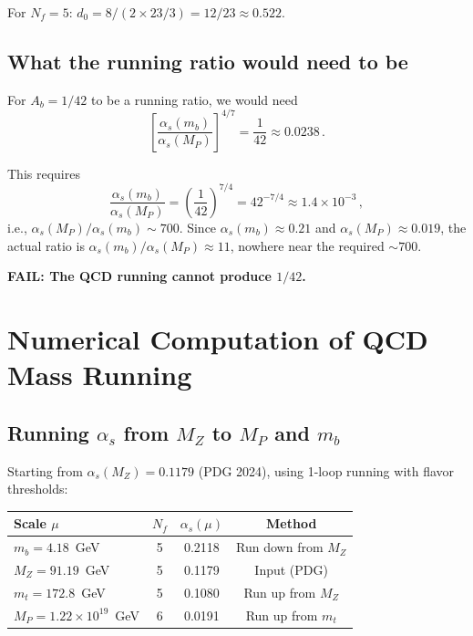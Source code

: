 \documentclass[11pt,a4paper]{article}
\newcommand{\as}{\alpha_s}
\newcommand{\Nf}{N_f}
\theoremstyle{definition}
\theoremstyle{remark}
\begin{document}
For $\Nf = 5$: $d_0 = 8/(2 \times 23/3) = 12/23 \approx 0.522$.

\subsection{What the running ratio would need to be}

For $A_b = 1/42$ to be a running ratio, we would need
\begin{equation}
\left[\frac{\as(m_b)}{\as(M_P)}\right]^{4/7} = \frac{1}{42} \approx 0.0238\,.
\end{equation}

This requires
\begin{equation}
\frac{\as(m_b)}{\as(M_P)} = \left(\frac{1}{42}\right)^{7/4} = 42^{-7/4} \approx 1.4 \times 10^{-3}\,,
\end{equation}
i.e., $\as(M_P)/\as(m_b) \sim 700$.  Since $\as(m_b) \approx 0.21$ and
$\as(M_P) \approx 0.019$, the actual ratio is $\as(m_b)/\as(M_P) \approx 11$,
nowhere near the required $\sim 700$.

\textcolor{fail}{\textbf{FAIL: The QCD running cannot produce $1/42$.}}

\section{Numerical Computation of QCD Mass Running}
\label{sec:numerical}

\subsection{Running $\as$ from $M_Z$ to $M_P$ and $m_b$}

Starting from $\as(M_Z) = 0.1179$ (PDG 2024), using 1-loop running with
flavor thresholds:

\begin{center}
\begin{tabular}{lccc}
\toprule
Scale $\mu$ & $\Nf$ & $\as(\mu)$ & Method \\
\midrule
$m_b = 4.18$~GeV & 5 & 0.2118 & Run down from $M_Z$ \\
$M_Z = 91.19$~GeV & 5 & 0.1179 & Input (PDG) \\
$m_t = 172.8$~GeV & 5 & 0.1080 & Run up from $M_Z$ \\
$M_P = 1.22 \times 10^{19}$~GeV & 6 & 0.0191 & Run up from $m_t$ \\
\bottomrule
\end{tabular}
\end{center}
\end{document}
